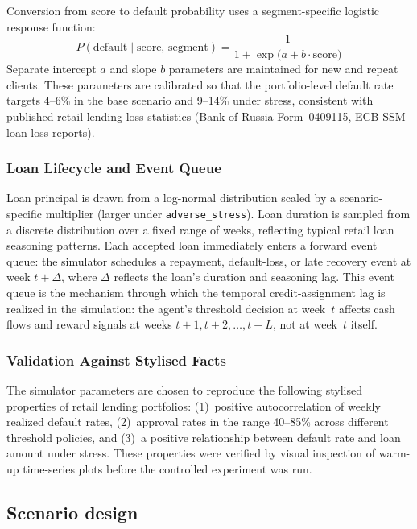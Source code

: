\documentclass[12pt,a4paper]{article}
\begin{document}
Conversion from score to default probability uses a segment-specific logistic response function:
\[
    P(\text{default} \mid \text{score},\, \text{segment})
    = \frac{1}{1 + \exp\!\bigl(a + b \cdot \text{score}\bigr)}
\]
Separate intercept $a$ and slope $b$ parameters are maintained for new and repeat clients. These parameters are calibrated so that the portfolio-level default rate targets 4--6\% in the base scenario and 9--14\% under stress, consistent with published retail lending loss statistics (Bank of Russia Form~0409115, ECB SSM loan loss reports).

\subsubsection{Loan Lifecycle and Event Queue}

Loan principal is drawn from a log-normal distribution scaled by a scenario-specific multiplier (larger under \texttt{adverse\_stress}). Loan duration is sampled from a discrete distribution over a fixed range of weeks, reflecting typical retail loan seasoning patterns. Each accepted loan immediately enters a forward event queue: the simulator schedules a repayment, default-loss, or late recovery event at week $t + \Delta$, where $\Delta$ reflects the loan's duration and seasoning lag. This event queue is the mechanism through which the temporal credit-assignment lag is realized in the simulation: the agent's threshold decision at week~$t$ affects cash flows and reward signals at weeks $t+1, t+2, \ldots, t+L$, not at week~$t$ itself.

\subsubsection{Validation Against Stylised Facts}

The simulator parameters are chosen to reproduce the following stylised properties of retail lending portfolios: (1)~positive autocorrelation of weekly realized default rates, (2)~approval rates in the range 40--85\% across different threshold policies, and (3)~a positive relationship between default rate and loan amount under stress. These properties were verified by visual inspection of warm-up time-series plots before the controlled experiment was run.

\subsection{Scenario design}
\end{document}
